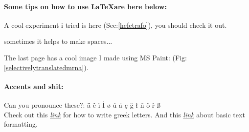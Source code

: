 \clearpage

\paragraph{Some tips on how to use \LaTeX are here below:}
\newline
A cool experiment i tried is here (Sec:\ref{hefetrafo}), you should check it out.
\\
\vspace{2cm}

sometimes it helps to make \hspace{5mm} spaces...

\newline

The last page has a cool image I made using MS Paint: (Fig:\ref{selectivelytranslatedmrna}).

\paragraph{Accents and shit:}

Can you pronounce these?: \newline
{\"a} {\^e} {\`i} {\.I} {\o} {\'u} {\aa} {\c c} {\u g} {\l} {\~n} {\H o} {\v r} {\ss}
\\
\newline
Check out this \textit{\underline{\href{https://www.overleaf.com/learn/latex/List_of_Greek_letters_and_math_symbols#Greek_letters}{link}}} for how to write greek letters.
And this  \textit{\underline{\href{https://www.overleaf.com/learn/latex/Bold,_italics_and_underlining#Italicized_text}{link}}} about basic text formatting.\\
